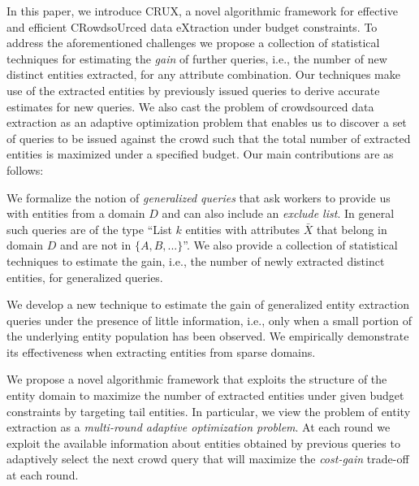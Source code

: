 In this paper, we introduce CRUX, a novel algorithmic framework for effective and efficient CRowdsoUrced data eXtraction under budget constraints. To address the aforementioned challenges we propose a collection of  statistical techniques for estimating the {\em gain} of further queries, i.e., the number of new distinct entities extracted, for any attribute combination. Our techniques make use of the extracted entities by previously issued queries to derive accurate estimates for new queries. We also cast the problem of crowdsourced data extraction as an adaptive optimization problem that enables us to discover a set of queries to be issued against the crowd such that the total number of extracted entities is maximized under a specified budget. Our main contributions are as follows:
\squishlist
\item We formalize the notion of {\em generalized queries} that ask workers to provide us with entities from a domain $D$ and can also include an {\em exclude list}. In general such queries are of the type ``List $k$ entities with attributes $\bar{X}$ that belong in domain $D$ and are not in $\{A, B, ...\}$''.  We also provide a collection of statistical techniques to estimate the gain, i.e., the number of newly extracted distinct entities, for generalized queries. 
\item We develop a new technique to estimate the gain of generalized entity extraction queries under the presence of little information, i.e., only when a small portion of the underlying entity population has been observed. We empirically demonstrate its effectiveness when extracting entities from sparse domains.
\item We propose a novel algorithmic framework that exploits the structure of the entity domain to maximize the number of extracted entities under given budget constraints by targeting tail entities. In particular, we view the problem of entity extraction as a {\em multi-round adaptive optimization problem}. At  each round we exploit the available information about entities obtained by previous queries to adaptively select the next crowd query that will maximize the {\em cost-gain} trade-off at each round. 
\squishend

